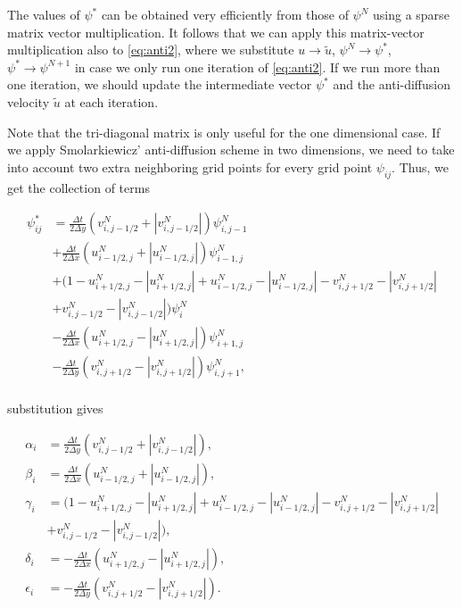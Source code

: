 \documentclass[10pt, a4paper]{article}
\newcommand{\abs}[1]{\left\lvert#1\right\rvert}
\begin{document}
The values of $\psi^*$ can be obtained very efficiently from those of $\psi^N$ using a sparse matrix vector multiplication. It follows that we can apply this matrix-vector multiplication also to \ref{eq:anti2}, where we substitute $u \rightarrow \tilde{u}$, $\psi^N \rightarrow \psi^*$, $\psi^* \rightarrow \psi^{N+1}$ in case we only run one iteration of \ref{eq:anti2}. If we run more than one iteration, we should update the intermediate vector $\psi^*$ and the anti-diffusion velocity $\tilde{u}$ at each iteration.

Note that the tri-diagonal matrix is only useful for the one dimensional case. If we apply Smolarkiewicz' anti-diffusion scheme in two dimensions, we need to take into account two extra neighboring grid points for every grid point $\psi_{ij}$. Thus, we get the collection of terms

\begin{align*}
\psi_{ij}^* &=
\frac{\Delta t}{2 \Delta y} \left( v_{i,j-1/2}^N + \abs{v_{i,j-1/2}^N} \right) \psi_{i,j-1}^N\\
&+\frac{\Delta t}{2 \Delta x} \left( u_{i-1/2,j}^N + \abs{u_{i-1/2,j}^N} \right) \psi_{i-1,j}^N\\
&+ \Big(1 - u_{i+1/2,j}^N - \abs{u_{i+1/2,j}^N} + u_{i-1/2,j}^N - \abs{u_{i-1/2,j}^N} - v_{i,j+1/2}^N - \abs{v_{i,j+1/2}^N} \\
&+ v_{i,j-1/2}^N - \abs{v_{i,j-1/2}^N} \Big) \psi_i^N\\
&-\frac{\Delta t}{2 \Delta x} \left( u_{i+1/2,j}^N - \abs{u_{i+1/2,j}^N} \right) \psi_{i+1,j}^N\\
&-\frac{\Delta t}{2 \Delta y} \left( v_{i,j+1/2}^N - \abs{v_{i,j+1/2}^N} \right) \psi_{i,j+1}^N,\\
\end{align*}

substitution gives

\begin{align*}
\alpha_i &= \frac{\Delta t}{2 \Delta y} \left( v_{i,j-1/2}^N + \abs{v_{i,j-1/2}^N} \right),\\
\beta_i &= \frac{\Delta t}{2 \Delta x} \left( u_{i-1/2,j}^N + \abs{u_{i-1/2,j}^N} \right),\\
\gamma_i &= \Big(1 - u_{i+1/2,j}^N - \abs{u_{i+1/2,j}^N} + u_{i-1/2,j}^N - \abs{u_{i-1/2,j}^N} - v_{i,j+1/2}^N - \abs{v_{i,j+1/2}^N} \\
&+ v_{i,j-1/2}^N - \abs{v_{i,j-1/2}^N} \Big),\\
\delta_i &= -\frac{\Delta t}{2 \Delta x} \left( u_{i+1/2,j}^N - \abs{u_{i+1/2,j}^N} \right),\\
\epsilon_i &= -\frac{\Delta t}{2 \Delta y} \left( v_{i,j+1/2}^N - \abs{v_{i,j+1/2}^N} \right).
\end{align*}
\end{document}
